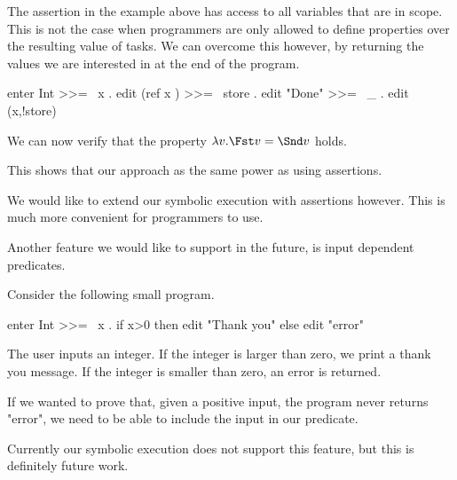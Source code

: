 The assertion in the example above has access to all variables that are in scope.
This is not the case when programmers are only allowed to define properties over the resulting value of tasks.
We can overcome this however, by returning the values we are interested in at the end of the program.

\begin{TASK}
  enter Int >>= \ x . edit (ref x ) >>= \ store . edit "Done" >>= \ _ . edit (x,!store)
\end{TASK}

We can now verify that the property $\lambda v . \Fst v = \Snd v$ holds.

This shows that our approach as the same power as using assertions.

We would like to extend our symbolic execution with assertions however.
This is much more convenient for programmers to use.

Another feature we would like to support in the future, is input dependent predicates.

\begin{example}
  Consider the following small program.

  \begin{TASK}
    enter Int >>= \ x . if x>0 then edit "Thank you" else edit "error"
  \end{TASK}

  The user inputs an integer.
  If the integer is larger than zero, we print a thank you message.
  If the integer is smaller than zero, an error is returned.

  If we wanted to prove that, given a positive input, the program never returns "error", we need to be able to include the input in our predicate.
\end{example}

Currently our symbolic execution does not support this feature, but this is definitely future work.
